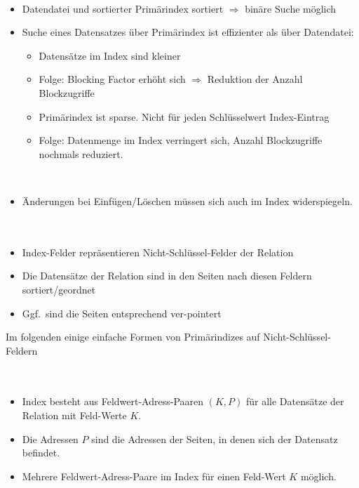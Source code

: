 \begin{frame}{\insertsection}
\framesubtitle{\insertsubsection}
\abs
{}
\begin{itemize}
	\item Datendatei und sortierter Prim\"arindex sortiert $\Rightarrow$ binäre Suche m\"oglich\\[6pt]
	\pause
	\item Suche eines Datensatzes über Prim\"arindex ist effizienter als \"uber Datendatei: 
	\begin{itemize}
		\item Datens\"atze im Index sind kleiner
		\item Folge: Blocking Factor erhöht sich $\Rightarrow$ Reduktion der Anzahl Blockzugriffe
		\item Prim\"arindex ist sparse. Nicht für jeden Schl\"usselwert Index-Eintrag
		\item Folge: Datenmenge im Index verringert sich, Anzahl Blockzugriffe nochmals reduziert.
	\end{itemize}
	\ \\[4pt]
	\pause
	\item Änderungen bei Einf\"ugen/L\"oschen m\"ussen sich auch im Index widerspiegeln.
\end{itemize}
\end{frame}

\begin{frame}{\insertsection}
\framesubtitle{\insertsubsection}
\\[4pt]
\begin{itemize}
\item Index-Felder repr\"asentieren Nicht-Schl\"ussel-Felder der Relation 
\item Die Datens\"atze der Relation sind in den Seiten nach diesen Feldern sortiert/geordnet
\item Ggf.~sind die Seiten entsprechend ver-pointert	
\end{itemize}
\abs
Im folgenden einige einfache Formen von Prim\"arindizes auf Nicht-Schl\"ussel-Feldern
\end{frame}

\begin{frame}{\insertsection}
\framesubtitle{\insertsubsection}
\\[4pt]
\begin{itemize}
\item Index besteht aus Feldwert-Adress-Paaren $(K,P)$ f\"ur alle Datens\"atze der Relation mit Feld-Werte $K$.
\item Die Adressen $P$ sind die Adressen der Seiten, in denen sich der Datensatz befindet.
\item Mehrere Feldwert-Adress-Paare im Index f\"ur einen Feld-Wert $K$ m\"oglich.
\end{itemize}
\end{frame}

